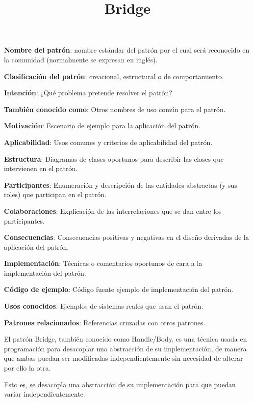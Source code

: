 \documentclass[a4paper,10pt]{report}
\begin{document}
    \item{\textbf{Nombre del patrón}: nombre estándar del patrón por el cual será reconocido en la comunidad (normalmente se expresan en inglés).}
    \item{\textbf{Clasificación del patrón}: creacional, estructural o de comportamiento.}
    \item{\textbf{Intención}: ¿Qué problema pretende resolver el patrón? }
    \item{\textbf{También conocido como}: Otros nombres de uso común para el patrón.}
    \item{\textbf{Motivación}: Escenario de ejemplo para la aplicación del patrón.}
    \item{\textbf{Aplicabilidad}: Usos comunes y criterios de aplicabilidad del patrón.}
    \item{\textbf{Estructura}: Diagramas de clases oportunos para describir las clases que intervienen en el patrón.}
    \item{\textbf{Participantes}: Enumeración y descripción de las entidades abstractas (y sus roles) que participan en el patrón.}
    \item{\textbf{Colaboraciones}: Explicación de las interrelaciones que se dan entre los participantes.}
    \item{\textbf{Consecuencias}: Consecuencias positivas y negativas en el diseño derivadas de la aplicación del patrón.}
    \item{\textbf{Implementación}: Técnicas o comentarios oportunos de cara a la implementación del patrón.}
    \item{\textbf{Código de ejemplo}: Código fuente ejemplo de implementación del patrón.}
    \item{\textbf{Usos conocidos}: Ejemplos de sistemas reales que usan el patrón.}
    \item{\textbf{Patrones relacionados}: Referencias cruzadas con otros patrones.}                                            
    
\title{\textbf{Bridge\\}}

El patrón Bridge, también conocido como Handle/Body, es una técnica usada en programación para desacoplar una abstracción de su implementación, de manera que ambas puedan ser modificadas independientemente sin necesidad de alterar por ello la otra.

Esto es, se desacopla una abstracción de su implementación para que puedan variar independientemente.\\
\end{document}
